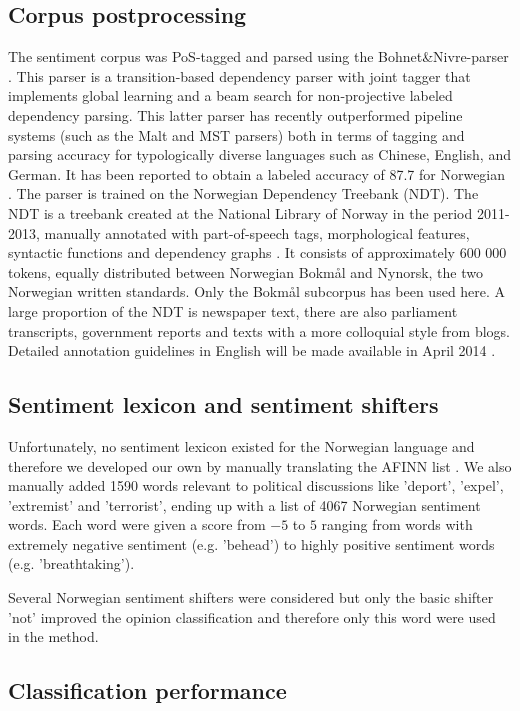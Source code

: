 \documentclass[11pt]{article}
\begin{document}
\subsection{Corpus postprocessing}
The sentiment corpus was PoS-tagged and parsed using the
Bohnet\&Nivre-parser \cite{Boh:Niv:12}. This parser is a
transition-based dependency parser with joint tagger that implements
global learning and a beam search for non-projective labeled
dependency parsing.  This latter parser has recently outperformed
pipeline systems (such as the Malt and MST parsers) both in terms of
tagging and parsing accuracy for typologically diverse languages such
as Chinese, English, and German. It has been reported to obtain a
labeled accuracy of 87.7 for Norwegian \cite{Sol14}.  The parser is
trained on the Norwegian Dependency Treebank (NDT). The NDT is a
treebank created at the National Library of Norway in the period
2011-2013, manually annotated with part-of-speech tags, morphological
features, syntactic functions and dependency graphs \cite{Sol14,
  Sol13}. It consists of approximately 600 000 tokens, equally
distributed between Norwegian Bokm{\aa}l and Nynorsk, the two Norwegian
written standards. Only the Bokm{\aa}l subcorpus has been used here. A
large proportion of the NDT is newspaper text, there are also
parliament transcripts, government reports and texts with a more
colloquial style from blogs. Detailed annotation guidelines in English
will be made available in April 2014 \cite{Kinn2013}.

\subsection{Sentiment lexicon and sentiment shifters}

Unfortunately, no sentiment lexicon existed for the Norwegian language and therefore we developed our own by manually translating the AFINN list \cite{Nielsen11}. We also manually added 1590 words relevant to political discussions  like 'deport', 'expel', 'extremist' and 'terrorist', ending up with a list of 4067 Norwegian sentiment words. Each word were given a score from $-5$ to $5$ ranging from words with extremely negative sentiment (e.g. 'behead') to highly positive sentiment words (e.g. 'breathtaking').

Several Norwegian sentiment shifters were considered but only the basic shifter 'not' improved the opinion classification and therefore only this word were used in the method.

\subsection{Classification performance}
\end{document}
